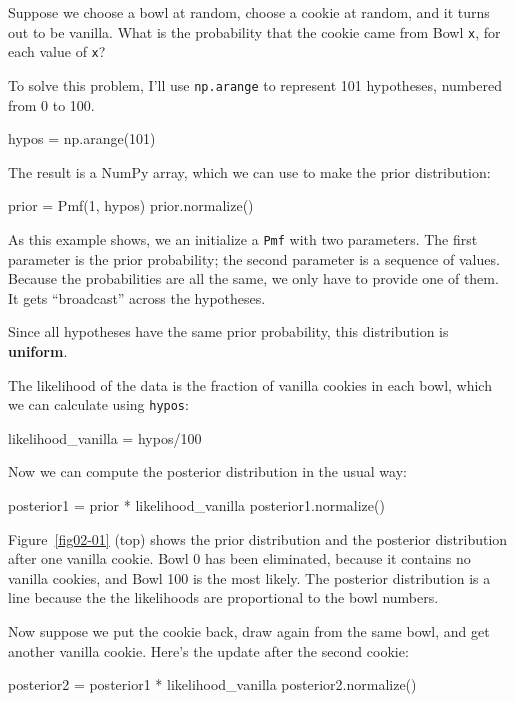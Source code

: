 \documentclass[12pt]{book}
\theoremstyle{exercise}
\newcommand{\py}[1]{{\tt #1}}%
\begin{document}
Suppose we choose a bowl at random, choose a cookie at random, and it turns out to be vanilla.  What is the probability that the cookie came from Bowl \py{x}, for each value of \py{x}?

To solve this problem, I'll use \py{np.arange} to represent 101 hypotheses, numbered from 0 to 100.

\begin{code}
hypos = np.arange(101)
\end{code}

The result is a NumPy array, which we can use to make the prior distribution:

\begin{code}
prior = Pmf(1, hypos)
prior.normalize()
\end{code}

As this example shows, we an initialize a \py{Pmf} with two parameters.
The first parameter is the prior probability; the second parameter is a sequence of values.
Because the probabilities are all the same, we only have to provide one of them.
It gets ``broadcast'' across the hypotheses.

Since all hypotheses have the same prior probability, this distribution is {\bf uniform}.

The likelihood of the data is the fraction of vanilla cookies in each bowl, which we can calculate using \py{hypos}:

\begin{code}
likelihood_vanilla = hypos/100
\end{code}

Now we can compute the posterior distribution in the usual way:

\begin{code}
posterior1 = prior * likelihood_vanilla
posterior1.normalize()
\end{code}

Figure~\ref{fig02-01} (top) shows the prior distribution and the posterior distribution after one vanilla cookie.
Bowl 0 has been eliminated, because it contains no vanilla cookies, and Bowl 100 is the most likely.
The posterior distribution is a line because the the likelihoods are proportional to the bowl numbers.

Now suppose we put the cookie back, draw again from the same bowl, and get another vanilla cookie.
Here's the update after the second cookie:

\begin{code}
posterior2 = posterior1 * likelihood_vanilla
posterior2.normalize()
\end{code}
\end{document}
